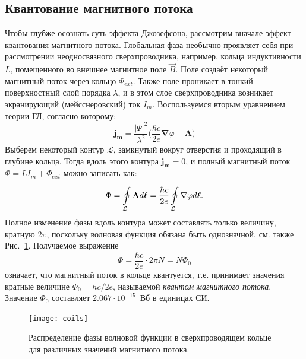 \subsection{Квантование магнитного потока}
Чтобы глубже осознать суть эффекта Джозефсона, рассмотрим вначале эффект квантования магнитного потока.
Глобальная фаза необычно проявляет себя при рассмотрении неодносвязного сверхпроводника, например, кольца индуктивности $L$, помещенного во внешнее магнитное поле $\vec{B}$. Поле создаёт некоторый магнитный поток через кольцо $\Phi_{ext}$. Также поле проникает в тонкий поверхностный слой порядка $\lambda$, и в этом слое сверхпроводника возникает экранирующий (мейсснеровский) ток $I_m$. Воспользуемся вторым уравнением теории ГЛ, согласно которому:
\begin{equation}
\mathbf{j_m} = \frac{|\Psi|^2}{\lambda^2}\big(\frac{\hbar c}{2e}\mathbf{\nabla}\varphi-\mathbf{A}\big)
\label{eq:2GL}
\end{equation} 
Выберем некоторый контур $\mathcal{L}$, замкнутый вокруг отверстия и проходящий в глубине кольца. Тогда вдоль этого контура $\mathbf{j_m}=0$, и полный магнитный поток $\Phi\!=\!LI_m\!+\!\Phi_{ext}$ можно записать как:
\begin{equation}
\Phi = \oint\displaylimits_{\mathcal{L}}^{} \mathbf{A} d\boldsymbol{\ell} = \frac{\hbar c}{2e}\oint\displaylimits_{\mathcal{L}}^{} \nabla\varphi d\boldsymbol{\ell}.
\label{eq: 2GL}
\end{equation}
Полное изменение фазы вдоль контура может составлять только величину, кратную $2\pi$, поскольку волновая функция обязана быть однозначной, см. также Рис.~\ref{img:coils}. Получаемое выражение
\begin{equation}
\Phi = \frac{\hbar c}{2e} \cdot 2\pi N = N\Phi_0
\label{eq: flux_q}
\end{equation}
означает, что магнитный поток в кольце квантуется, т.е. принимает значения кратные величине $\Phi_0={hc}/{2e}$, называемой \textit{квантом магнитного потока}. Значение $\Phi_0$ составляет $2.067\cdot10^{-15}$~Вб в единицах СИ. 	
\begin{figure}[ht] 
	\centering
	\texttt{[image: coils]}
	\caption{Распределение фазы волновой функции в сверхпроводящем кольце для различных значений магнитного потока.  }
	\label{img:coils}
\end{figure}

